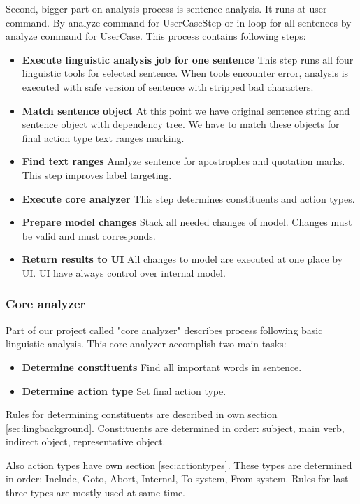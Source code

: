 Second, bigger part on analysis process is sentence analysis. It runs at user command. By analyze command for UserCaseStep or in loop for all sentences by analyze command for UserCase. This process contains following steps:

\begin{itemize}
\item {\bf Execute linguistic analysis job for one sentence} This step runs all four linguistic tools for selected sentence. When tools encounter error, analysis is executed with safe version of sentence with stripped bad characters. 
\item {\bf Match sentence object} At this point we have original sentence string and sentence object with dependency tree. We have to match these objects for final action type text ranges marking.
\item {\bf Find text ranges} Analyze sentence for apostrophes and quotation marks. This step improves label targeting.
\item {\bf Execute core analyzer} This step determines constituents and action types.
\item {\bf Prepare model changes} Stack all needed changes of model. Changes must be valid and must corresponds.
\item {\bf Return results to UI} All changes to model are executed at one place by UI. UI have always control over internal model.
\end{itemize}

\subsubsection{Core analyzer}
Part of our project called "core analyzer" describes process following basic linguistic analysis. This core analyzer accomplish two main tasks:

\begin{itemize}
\item {\bf Determine constituents} Find all important words in sentence.
\item {\bf Determine action type} Set final action type.
\end{itemize}

Rules for determining constituents are described in own section \ref{sec:lingbackground}. Constituents are determined in order: subject, main verb, indirect object, representative object.

Also action types have own section \ref{sec:actiontypes}. These types are determined in order: Include, Goto, Abort, Internal, To system, From system. Rules for last three types are mostly used at same time.

